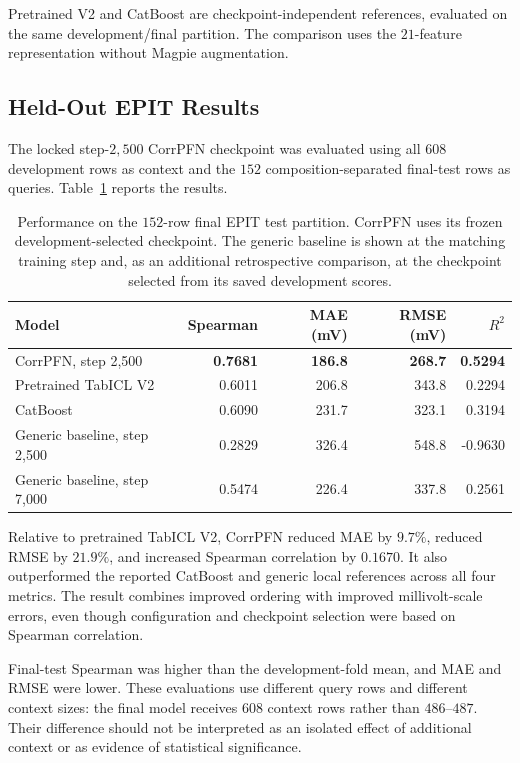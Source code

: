 \documentclass{article}
\begin{document}
Pretrained V2 and CatBoost are checkpoint-independent references, evaluated
on the same development/final partition. The comparison uses the
\(21\)-feature representation without Magpie augmentation.

\subsection{Held-Out EPIT Results}

The locked step-\(2{,}500\) CorrPFN checkpoint was evaluated using all
\(608\) development rows as context and the \(152\) composition-separated
final-test rows as queries. Table~\ref{tab:final-results} reports the results.

\begin{table}[htbp]
\centering
\caption{Performance on the \(152\)-row final EPIT test partition. CorrPFN
uses its frozen development-selected checkpoint. The generic baseline is
shown at the matching training step and, as an additional retrospective
comparison, at the checkpoint selected from its saved development scores.}
\label{tab:final-results}
\begin{tabular}{lrrrr}
\toprule
Model & Spearman & MAE (mV) & RMSE (mV) & \(R^2\) \\
\midrule
CorrPFN, step 2,500
    & \textbf{0.7681} & \textbf{186.8} & \textbf{268.7} & \textbf{0.5294} \\
Pretrained TabICL V2 & 0.6011 & 206.8 & 343.8 & 0.2294 \\
CatBoost & 0.6090 & 231.7 & 323.1 & 0.3194 \\
Generic baseline, step 2,500 & 0.2829 & 326.4 & 548.8 & -0.9630 \\
Generic baseline, step 7,000 & 0.5474 & 226.4 & 337.8 & 0.2561 \\
\bottomrule
\end{tabular}
\end{table}

Relative to pretrained TabICL V2, CorrPFN reduced MAE by \(9.7\%\), reduced
RMSE by \(21.9\%\), and increased Spearman correlation by \(0.1670\).
It also outperformed the reported CatBoost and generic local references
across all four metrics. The result combines improved ordering with improved
millivolt-scale errors, even though configuration and checkpoint selection
were based on Spearman correlation.

Final-test Spearman was higher than the development-fold mean, and MAE and
RMSE were lower. These evaluations use different query rows and different
context sizes: the final model receives \(608\) context rows rather than
\(486\)--\(487\). Their difference should not be interpreted as an isolated
effect of additional context or as evidence of statistical significance.
\end{document}
